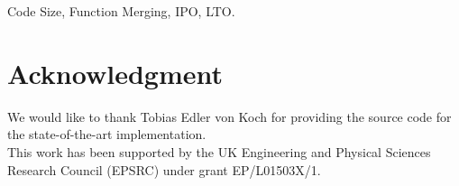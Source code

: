 \documentclass[conference,10pt]{IEEEtran}
\begin{document}
\maketitle


\begin{IEEEkeywords}
Code Size, Function Merging, IPO, LTO.
\end{IEEEkeywords}








%







\section*{Acknowledgment}
  We would like to thank Tobias Edler von Koch for providing the source
code for the state-of-the-art implementation.
  \\
  This work has been supported by the UK Engineering and Physical Sciences Research Council (EPSRC) under grant EP/L01503X/1.


%








\clearpage
\balance



\end{document}
